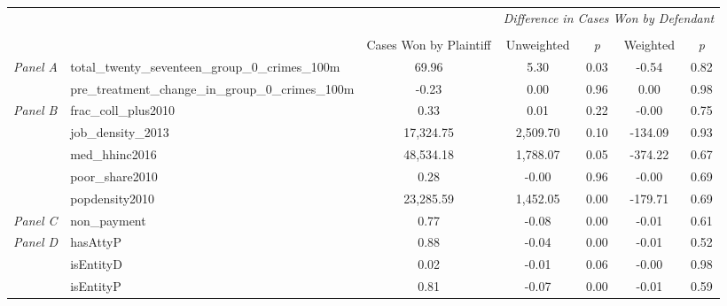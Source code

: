 \begin{tabular}{llccccc}
\toprule
 &  & \textit{} & \multicolumn{4}{c}{\textit{Difference in Cases Won by Defendant}} \\
\cline{4-7}
\\
 &  & Cases Won by Plaintiff & Unweighted & \emph{p} & Weighted & \emph{p} \\
\midrule
\multirow[c]{2}{3cm}{\textit{Panel A}} & total_twenty_seventeen_group_0_crimes_100m & 69.96 & 5.30 & 0.03 & -0.54 & 0.82 \\
 & pre_treatment_change_in_group_0_crimes_100m & -0.23 & 0.00 & 0.96 & 0.00 & 0.98 \\
\cline{1-7}
\multirow[c]{5}{3cm}{\textit{Panel B}} & frac_coll_plus2010 & 0.33 & 0.01 & 0.22 & -0.00 & 0.75 \\
 & job_density_2013 & 17,324.75 & 2,509.70 & 0.10 & -134.09 & 0.93 \\
 & med_hhinc2016 & 48,534.18 & 1,788.07 & 0.05 & -374.22 & 0.67 \\
 & poor_share2010 & 0.28 & -0.00 & 0.96 & -0.00 & 0.69 \\
 & popdensity2010 & 23,285.59 & 1,452.05 & 0.00 & -179.71 & 0.69 \\
\cline{1-7}
\textit{Panel C} & non_payment & 0.77 & -0.08 & 0.00 & -0.01 & 0.61 \\
\cline{1-7}
\multirow[c]{3}{3cm}{\textit{Panel D}} & hasAttyP & 0.88 & -0.04 & 0.00 & -0.01 & 0.52 \\
 & isEntityD & 0.02 & -0.01 & 0.06 & -0.00 & 0.98 \\
 & isEntityP & 0.81 & -0.07 & 0.00 & -0.01 & 0.59 \\
\cline{1-7}
\bottomrule
\end{tabular}
